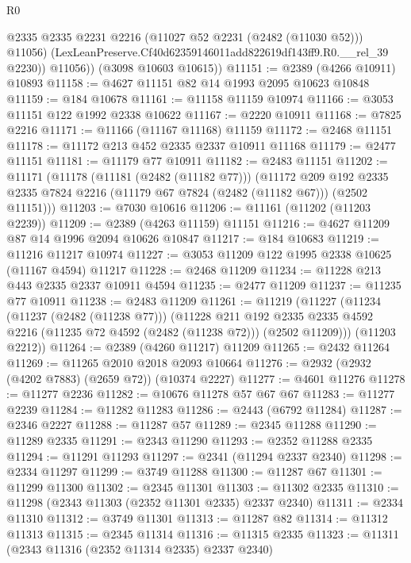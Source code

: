 \begin{lexlean}{R0}
\begin{coremodule}
              @2335
              @2335
              @2231
              @2216
              (@11027 @52 @2231 (@2482 (@11030 @52)))
              @11056)
            (LexLeanPreserve.Cf40d62359146011add822619df143ff9.R0.__rel_39 @2230))
          @11056))
      (@3098 @10603 @10615))
@11151 := @2389 (@4266 @10911) @10893
@11158 := @4627 @11151 @82 @14 @1993 @2095 @10623 @10848
@11159 := @184 @10678
@11161 := @11158 @11159 @10974
@11166 := @3053 @11151 @122 @1992 @2338 @10622
@11167 := @2220 @10911
@11168 := @7825 @2216
@11171 := @11166 (@11167 @11168) @11159
@11172 := @2468 @11151
@11178 := @11172 @213 @452 @2335 @2337 @10911 @11168
@11179 := @2477 @11151
@11181 := @11179 @77 @10911
@11182 := @2483 @11151
@11202 := @11171
    (@11178
      (@11181 (@2482 (@11182 @77)))
      (@11172
        @209
        @192
        @2335
        @2335
        @7824
        @2216
        (@11179 @67 @7824 (@2482 (@11182 @67)))
        (@2502 @11151)))
@11203 := @7030 @10616
@11206 := @11161 (@11202 (@11203 @2239))
@11209 := @2389 (@4263 @11159) @11151
@11216 := @4627 @11209 @87 @14 @1996 @2094 @10626 @10847
@11217 := @184 @10683
@11219 := @11216 @11217 @10974
@11227 := @3053 @11209 @122 @1995 @2338 @10625 (@11167 @4594) @11217
@11228 := @2468 @11209
@11234 := @11228 @213 @443 @2335 @2337 @10911 @4594
@11235 := @2477 @11209
@11237 := @11235 @77 @10911
@11238 := @2483 @11209
@11261 := @11219
    (@11227
      (@11234
        (@11237 (@2482 (@11238 @77)))
        (@11228
          @211
          @192
          @2335
          @2335
          @4592
          @2216
          (@11235 @72 @4592 (@2482 (@11238 @72)))
          (@2502 @11209)))
      (@11203 @2212))
@11264 := @2389 (@4260 @11217) @11209
@11265 := @2432 @11264
@11269 := @11265 @2010 @2018 @2093 @10664
@11276 := @2932 (@2932 (@4202 @7883) (@2659 @72)) (@10374 @2227)
@11277 := @4601 @11276
@11278 := @11277 @2236
@11282 := @10676 @11278 @57 @67 @67
@11283 := @11277 @2239
@11284 := @11282 @11283
@11286 := @2443 (@6792 @11284)
@11287 := @2346 @2227
@11288 := @11287 @57
@11289 := @2345 @11288
@11290 := @11289 @2335
@11291 := @2343 @11290
@11293 := @2352 @11288 @2335
@11294 := @11291 @11293
@11297 := @2341 (@11294 @2337 @2340)
@11298 := @2334 @11297
@11299 := @3749 @11288
@11300 := @11287 @67
@11301 := @11299 @11300
@11302 := @2345 @11301
@11303 := @11302 @2335
@11310 := @11298 (@2343 @11303 (@2352 @11301 @2335) @2337 @2340)
@11311 := @2334 @11310
@11312 := @3749 @11301
@11313 := @11287 @82
@11314 := @11312 @11313
@11315 := @2345 @11314
@11316 := @11315 @2335
@11323 := @11311 (@2343 @11316 (@2352 @11314 @2335) @2337 @2340)

\end{coremodule}
\end{lexlean}
